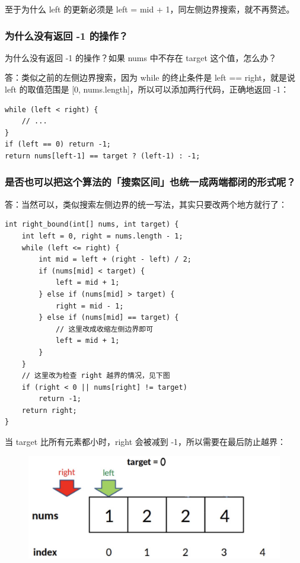 \documentclass[12pt]{article}
\begin{document}
至于为什么 left 的更新必须是 left = mid + 1，同左侧边界搜索，就不再赘述。

\subsubsection{为什么没有返回 -1 的操作？}
为什么没有返回 -1 的操作？如果 nums 中不存在 target 这个值，怎么办？

答：类似之前的左侧边界搜索，因为 while 的终止条件是 left == right，就是说 left 的取值范围是 [0, nums.length]，所以可以添加两行代码，正确地返回 -1：
\begin{lstlisting}
while (left < right) {
    // ...
}
if (left == 0) return -1;
return nums[left-1] == target ? (left-1) : -1;
\end{lstlisting}

\subsubsection{是否也可以把这个算法的「搜索区间」也统一成两端都闭的形式呢？}
答：当然可以，类似搜索左侧边界的统一写法，其实只要改两个地方就行了：
\begin{lstlisting}
int right_bound(int[] nums, int target) {
    int left = 0, right = nums.length - 1;
    while (left <= right) {
        int mid = left + (right - left) / 2;
        if (nums[mid] < target) {
            left = mid + 1;
        } else if (nums[mid] > target) {
            right = mid - 1;
        } else if (nums[mid] == target) {
            // 这里改成收缩左侧边界即可
            left = mid + 1;
        }
    }
    // 这里改为检查 right 越界的情况，见下图
    if (right < 0 || nums[right] != target)
        return -1;
    return right;
}
\end{lstlisting}

当 target 比所有元素都小时，right 会被减到 -1，所以需要在最后防止越界：
\begin{figure}[H]
    \centering
    \includegraphics[width=1\textwidth]{fig/Binary_Search_4.png}
\end{figure}
\end{document}
